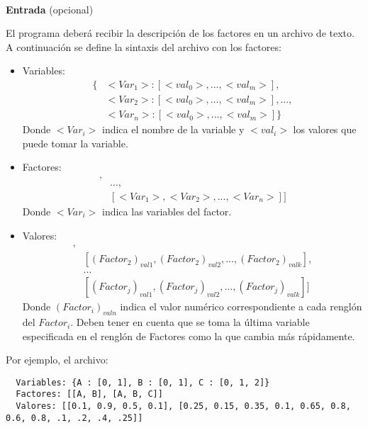 \textbf{\\Entrada} (opcional)\bigskip

\noindent El programa deberá recibir la descripción de los factores en un archivo de texto. A continuación se define la sintaxis del archivo con los factores:

\begin{itemize}
  \item Variables: 
    \begin{align*}
      \{&<Var_1>:[<val_0>, . . . , <val_m>],\\
        &<Var_2>:[<val_0>, . . . , <val_m>], . . . ,\\
        &<Var_n>:[<val_0>, . . . , <val_m>]\}
    \end{align*}
    Donde \(<Var_{i}>\) indica el nombre de la variable y \(<val_i>\) los valores que puede tomar la variable.
    
  \item Factores: 
    \begin{align*}
      [& [<Var_1>,<Var_2>, . . . , <Var_n>], \\
       & . . . , \\
       & [<Var_1>,<Var_2>, . . . , <Var_n>]]
    \end{align*}
    Donde \(<Var_{i}>\) indica las variables del factor.
    
  \item Valores: 
    \begin{align*}
      [&[(Factor_1)_{val1}, (Factor_1)_{val2}, . . . , (Factor_1)_{valk}],\\
       &[(Factor_2)_{val1}, (Factor_2)_{val2}, . . . , (Factor_2)_{valk}],\\
       & . . . \\
       &[(Factor_j)_{val1}, (Factor_j)_{val2}, . . . , (Factor_j)_{valk}]]
    \end{align*}
    Donde \((Factor_i)_{valn}\) indica el valor numérico correspondiente a cada renglón del \(Factor_i\). Deben tener en cuenta que se toma la última variable especificada en el renglón de Factores como la que cambia más rápidamente.
\end{itemize}


\noindent Por ejemplo, el archivo:

\begin{verbatim}
  Variables: {A : [0, 1], B : [0, 1], C : [0, 1, 2]}
  Factores: [[A, B], [A, B, C]]
  Valores: [[0.1, 0.9, 0.5, 0.1], [0.25, 0.15, 0.35, 0.1, 0.65, 0.8, 0.6, 0.8, .1, .2, .4, .25]]
\end{verbatim}

